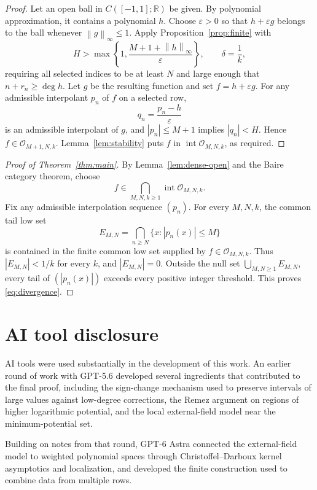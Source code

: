 \documentclass[11pt]{article}
\theoremstyle{definition}
\numberwithin{equation}{section}
\newcommand{\R}{\mathbb R}
\newcommand{\norm}[1]{\left\lVert #1\right\rVert}
\begin{document}
\begin{proof}
Let an open ball in \(C([-1,1];\R)\) be given.
By polynomial approximation, it contains a polynomial \(h\).
Choose \(\varepsilon>0\) so that \(h+\varepsilon g\) belongs to
the ball whenever \(\norm{g}_\infty\le1\).
Apply Proposition~\ref{prop:finite} with
\[
 H>\max\left\{1,\frac{M+1+\norm{h}_\infty}{\varepsilon}\right\},
 \qquad \delta=\frac1k,
\]
requiring all selected indices to be at least \(N\) and large enough
that \(n+r_n\ge\deg h\).
Let \(g\) be the resulting function and set \(f=h+\varepsilon g\).
For any admissible interpolant \(p_n\) of \(f\) on a selected row,
\[
 q_n=\frac{p_n-h}{\varepsilon}
\]
is an admissible interpolant of \(g\), and \(|p_n|\le M+1\)
implies \(|q_n|<H\). Hence \(f\in\mathcal O_{M+1,N,k}\).
Lemma~\ref{lem:stability} puts \(f\) in
\(\operatorname{int}\mathcal O_{M,N,k}\), as required.
\end{proof}

\begin{proof}[Proof of Theorem~\ref{thm:main}]
By Lemma~\ref{lem:dense-open} and the Baire category theorem, choose
\[
 f\in\bigcap_{M,N,k\ge1}\operatorname{int}\mathcal O_{M,N,k}.
\]
Fix any admissible interpolation sequence \((p_n)\).
For every \(M,N,k\), the common tail low set
\[
 E_{M,N}=\bigcap_{n\ge N}\{x:|p_n(x)|\le M\}
\]
is contained in the finite common low set supplied by
\(f\in\mathcal O_{M,N,k}\). Thus \(|E_{M,N}|<1/k\) for every
\(k\), and \(|E_{M,N}|=0\).
Outside the null set \(\bigcup_{M,N\ge1}E_{M,N}\), every tail
of \((|p_n(x)|)\) exceeds every positive integer threshold.
This proves \eqref{eq:divergence}.
\end{proof}

\section*{AI tool disclosure}

AI tools were used substantially in the development of this work.
An earlier round of work with GPT-5.6 developed several ingredients
that contributed to the final proof, including the sign-change
mechanism used to preserve intervals of large values against low-degree
corrections, the Remez argument on regions of higher logarithmic
potential, and the local external-field model near the minimum-potential
set.

Building on notes from that round, GPT-6 Astra connected the
external-field model to weighted polynomial spaces through
Christoffel--Darboux kernel asymptotics and localization, and developed
the finite construction used to combine data from multiple rows.
\end{document}
